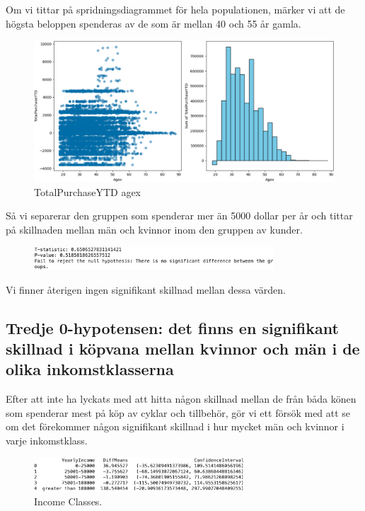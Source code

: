 \documentclass[]{article}
\begin{document}
Om vi tittar på spridningsdiagrammet för hela populationen, märker vi att de högsta beloppen spenderas av de som är mellan 40 och 55 år gamla.
\begin{figure}[h]
    \centering
    \includegraphics[width=\textwidth]{img_total_purchase_ytd_agex.png}
    \caption{TotalPurchaseYTD agex}
\end{figure}
Så vi separerar den gruppen som spenderar mer än 5000 dollar per år och tittar på skillnaden mellan män och kvinnor inom den gruppen av kunder.
\begin{figure}[h]
    \centering
    \includegraphics[width=0.8\textwidth]{img_spenderarklassen.png}
\end{figure}
Vi finner återigen ingen signifikant skillnad mellan dessa värden.








\subsection{Tredje 0-hypotensen: det finns en signifikant skillnad i köpvana mellan kvinnor och män i de olika inkomstklasserna}

Efter att inte ha lyckats med att hitta någon skillnad mellan de från båda könen som spenderar mest på köp av cyklar och tillbehör, gör vi ett försök med att se om det förekommer någon signifikant skillnad i hur mycket män och kvinnor i varje inkomstklass.
\begin{figure}[h]
    \centering
    \includegraphics[width=0.7\textwidth]{img_income_classes.png}
    \caption{Income Classes.}
\end{figure}
\end{document}
